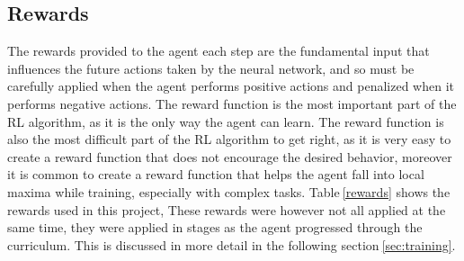 \begin{table}[h]
    \centering
    \caption{Actions}\label{actions}
\end{table}


\subsection{Rewards}

The rewards provided to the agent each step are the fundamental input that influences the future actions taken by the neural network, and so must be carefully applied when the agent performs positive actions and penalized when it performs negative actions. The reward function is the most important part of the RL algorithm, as it is the only way the agent can learn. The reward function is also the most difficult part of the RL algorithm to get right, as it is very easy to create a reward function that does not encourage the desired behavior, moreover it is common to create a reward function that helps the agent fall into local maxima while training, especially with complex tasks. Table$~$\ref{rewards} shows the rewards used in this project, These rewards were however not all applied at the same time, they were applied in stages as the agent progressed through the curriculum. This is discussed in more detail in the following section$~$\ref{sec:training}.


